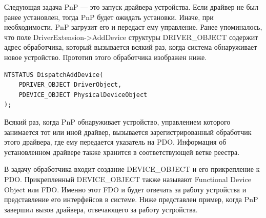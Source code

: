 \documentclass[14pt,a4paper]{article}
\begin{document}
\par Следующая задача PnP — это запуск драйвера устройства. Если драйвер не был ранее установлен, тогда PnP будет ожидать установки. Иначе, при необходимости, PnP загрузит его и передаст ему управление. Ранее упоминалось, что поле DriverExtension->AddDevice структуры DRIVER\_OBJECT содержит адрес обработчика, который вызывается всякий раз, когда система обнаруживает новое устройство. Прототип этого обработчика изображен ниже.\\

\begin{lstlisting}[language=c caption={Обработчик добавления устройства}]
NTSTATUS DispatchAddDevice( 
	PDRIVER_OBJECT DriverObject, 
	PDEVICE_OBJECT PhysicalDeviceObject 
); 
\end{lstlisting}

Всякий раз, когда PnP обнаруживает устройство, управлением которого занимается тот или иной драйвер, вызывается зарегистрированный обработчик этого драйвера, где ему передается указатель на PDO. Информация об установленном драйвере также хранится в соответствующей ветке реестра.\\

\par В задачу обработчика входит создание DEVICE\_OBJECT и его прикрепление к PDO. Прикрепленный DEVICE\_OBJECT также называют Functional Device Object или FDO. Именно этот FDO и будет отвечать за работу устройства и представление его интерфейсов в системе. Ниже представлен пример, когда PnP завершил вызов драйвера, отвечающего за работу устройства. \\


\begin{figure}[H]
  \centering
  \caption{}
\end{figure}
\end{document}
